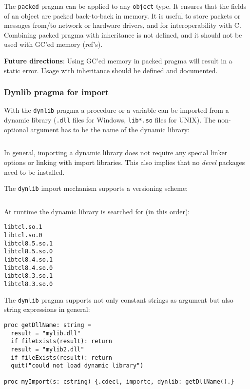 The \texttt{packed} pragma can be applied to any \texttt{object} type.
It ensures that the fields of an object are packed back-to-back in
memory. It is useful to store packets or messages from/to network or
hardware drivers, and for interoperability with C. Combining packed
pragma with inheritance is not defined, and it should not be used with
GC'ed memory (ref's).

\textbf{Future directions}: Using GC'ed memory in packed pragma will
result in a static error. Usage with inheritance should be defined and
documented.

\hypertarget{dynlib-pragma-for-import}{%
\subsubsection{Dynlib pragma for
import}\label{dynlib-pragma-for-import}}

With the \texttt{dynlib} pragma a procedure or a variable can be
imported from a dynamic library (\texttt{.dll} files for Windows,
\texttt{lib*.so} files for UNIX). The non-optional argument has to be
the name of the dynamic library:

\begin{verbatim}
\end{verbatim}

In general, importing a dynamic library does not require any special
linker options or linking with import libraries. This also implies that
no \emph{devel} packages need to be installed.

The \texttt{dynlib} import mechanism supports a versioning scheme:

\begin{verbatim}
\end{verbatim}

At runtime the dynamic library is searched for (in this order):

\begin{verbatim}
libtcl.so.1
libtcl.so.0
libtcl8.5.so.1
libtcl8.5.so.0
libtcl8.4.so.1
libtcl8.4.so.0
libtcl8.3.so.1
libtcl8.3.so.0
\end{verbatim}

The \texttt{dynlib} pragma supports not only constant strings as
argument but also string expressions in general:

\begin{verbatim}
proc getDllName: string =
  result = "mylib.dll"
  if fileExists(result): return
  result = "mylib2.dll"
  if fileExists(result): return
  quit("could not load dynamic library")

proc myImport(s: cstring) {.cdecl, importc, dynlib: getDllName().}
\end{verbatim}

